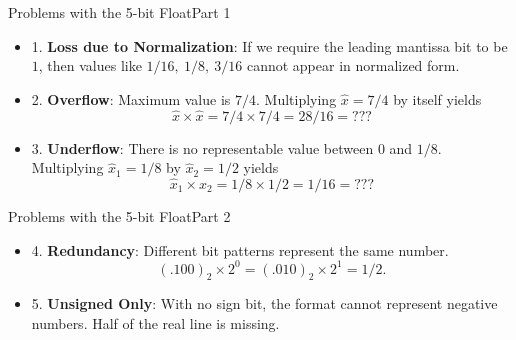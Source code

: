 \documentclass[10pt]{beamer}
\begin{document}
\begin{frame}{Problems with the 5-bit Float}{Part 1}
\begin{itemize}
    \item 1. \textbf{Loss due to Normalization}:  
      If we require the leading mantissa bit to be $1$, then values like  
      $1/16,\ 1/8,\ 3/16$ cannot appear in normalized form.
\begin{center}
\end{center}
\begin{center}
\end{center}

    \item 2. \textbf{Overflow}:  
      Maximum value is $7/4$. Multiplying $\hat{x}=7/4$ by itself yields
      $$ \hat{x} \times \hat{x} =7/4\times 7/4 = 28/16 = ???$$

    \item 3. \textbf{Underflow}: There is no representable value between $0$ and $1/8$. Multiplying 
      $\hat{x}_1=1/8$ by $\hat{x}_2=1/2$ yields
      $$ \hat{x}_1 \times \hat{x}_2 =1/8\times 1/2 = 1/16 = ???$$
      

\end{itemize}
\end{frame}

\begin{frame}{Problems with the 5-bit Float}{Part 2}
\begin{itemize}
    \item 4. \textbf{Redundancy}:  
      Different bit patterns represent the same number.  
      $$ (.100)_2 \times 2^{0} = (.010)_2 \times 2^{1} = 1/2.$$

    \item 5. \textbf{Unsigned Only}:  
      With no sign bit, the format cannot represent negative numbers.  
      Half of the real line is missing.

\end{itemize}

\bigskip
{}
\end{frame}
\end{document}
